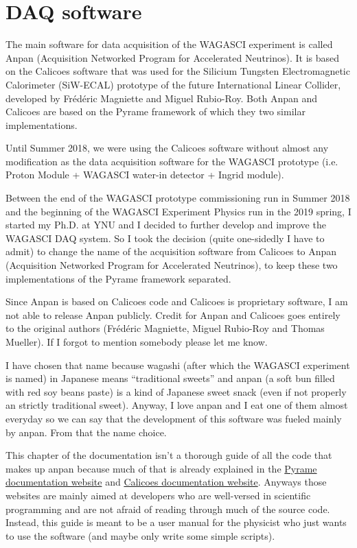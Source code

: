\chapter{DAQ software}
The main software for data acquisition of the WAGASCI experiment is
called Anpan (Acquisition Networked Program for Accelerated
Neutrinos). It is based on the Calicoes software that was used for the
Silicium Tungsten Electromagnetic Calorimeter (SiW-ECAL) prototype of
the future International Linear Collider, developed by Frédéric
Magniette and Miguel Rubio-Roy. Both Anpan and Calicoes are based on
the Pyrame framework of which they two similar implementations.

Until Summer 2018, we were using the Calicoes software without almost
any modification as the data acquisition software for the WAGASCI
prototype (i.e. Proton Module + WAGASCI water-in detector + Ingrid
module).

Between the end of the WAGASCI prototype commissioning run in Summer 2018 and
the beginning of the WAGASCI Experiment Physics run in the 2019 spring, I
started my Ph.D. at YNU and I decided to further develop and improve the WAGASCI
DAQ system. So I took the decision (quite one-sidedly I have to admit) to change
the name of the acquisition software from Calicoes to Anpan (Acquisition
Networked Program for Accelerated Neutrinos), to keep these two implementations
of the Pyrame framework separated.

Since Anpan is based on Calicoes code and Calicoes is proprietary software, I am
not able to release Anpan publicly. Credit for Anpan and Calicoes goes entirely
to the original authors (Frédéric Magniette, Miguel Rubio-Roy and Thomas
Mueller). If I forgot to mention somebody please let me know.

I have chosen that name because wagashi (after which the WAGASCI
experiment is named) in Japanese means ``traditional sweets'' and
anpan (a soft bun filled with red soy beans paste) is a kind of
Japanese sweet snack (even if not properly an strictly traditional
sweet). Anyway, I love anpan and I eat one of them almost everyday so
we can say that the development of this software was fueled mainly by
anpan. From that the name choice.

This chapter of the documentation isn't a thorough guide of all the
code that makes up anpan because much of that is already explained in
the \href{http://llr.in2p3.fr/sites/pyrame/documentation/}{Pyrame
  documentation website} and
\href{http://llr.in2p3.fr/sites/pyrame/calicoes/documentation/}{Calicoes
  documentation website}. Anyways those websites are mainly aimed at
developers who are well-versed in scientific programming and are not
afraid of reading through much of the source code. Instead, this guide
is meant to be a user manual for the physicist who just wants to use
the software (and maybe only write some simple scripts).

